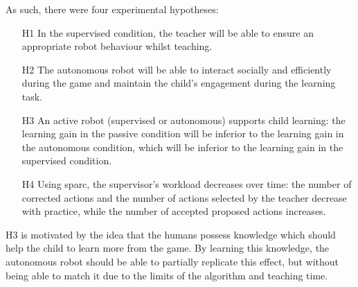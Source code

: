 
As such, there were four experimental hypotheses:
\begin{itemize}
	\item [H1] In the supervised condition, the teacher will be able to ensure an appropriate robot behaviour whilst teaching.
	\item [H2] The autonomous robot will be able to interact socially and efficiently during the game and maintain the child's engagement during the learning task.
	\item [H3] An active robot (supervised or autonomous) supports child learning: the learning gain in the passive condition will be inferior to the learning gain in the autonomous condition, which will be inferior to the learning gain in the supervised condition.
	\item [H4] Using \gls{sparc}, the supervisor's workload decreases over time: the number of corrected actions and the number of actions selected  by the teacher decrease with practice, while the number of accepted proposed actions increases.
\end{itemize}

H3 is motivated by the idea that the humans possess knowledge which should help the child to learn more from the game. By learning this knowledge, the autonomous robot should be able to partially replicate this effect, but without being able to match it due to the limits of the algorithm and teaching time.

